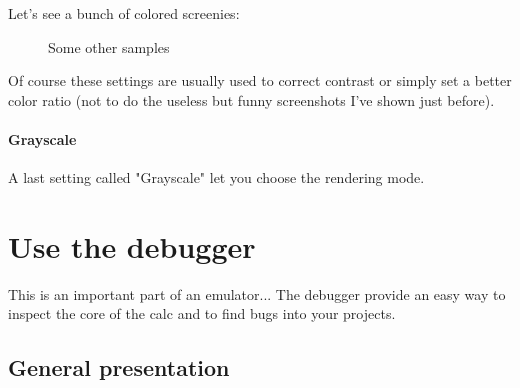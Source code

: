 \documentclass[10pt]{report}
\begin{document}
Let's see a bunch of colored screenies:\newline
\begin{figure}[H]
\centering
{}
\caption{Some other samples}
\end{figure}

Of course these settings are usually used to correct contrast or simply set a better color ratio (not to do the useless but funny screenshots I've shown just before).\newline

\paragraph{Grayscale}

A last setting called "Grayscale" let you choose the rendering mode.\newline

\section{Use the debugger}
This is an important part of an emulator...\newline
The debugger provide an easy way to inspect the core of the calc and to find bugs into your projects.\newline

\subsection{General presentation}
\end{document}
